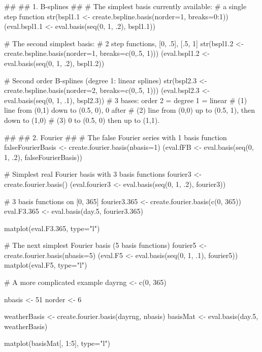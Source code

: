 \documentclass{article}
\begin{document}
\begin{Examples}
\begin{ExampleCode}
##
## 1.  B-splines
## 
# The simplest basis currently available:
# a single step function  
str(bspl1.1 <- create.bspline.basis(norder=1, breaks=0:1))
(eval.bspl1.1 <- eval.basis(seq(0, 1, .2), bspl1.1))

# The second simplest basis:
# 2 step functions, [0, .5], [.5, 1]
str(bspl1.2 <- create.bspline.basis(norder=1, breaks=c(0,.5, 1)))
(eval.bspl1.2 <- eval.basis(seq(0, 1, .2), bspl1.2))

# Second order B-splines (degree 1:  linear splines) 
str(bspl2.3 <- create.bspline.basis(norder=2, breaks=c(0,.5, 1)))
(eval.bspl2.3 <- eval.basis(seq(0, 1, .1), bspl2.3))
# 3 bases:  order 2 = degree 1 = linear 
# (1) line from (0,1) down to (0.5, 0), 0 after
# (2) line from (0,0) up to (0.5, 1), then down to (1,0)
# (3) 0 to (0.5, 0) then up to (1,1).

##
## 2.  Fourier 
## 
# The false Fourier series with 1 basis function
falseFourierBasis <- create.fourier.basis(nbasis=1)
(eval.fFB <- eval.basis(seq(0, 1, .2), falseFourierBasis))

# Simplest real Fourier basis with 3 basis functions
fourier3 <- create.fourier.basis()
(eval.fourier3 <- eval.basis(seq(0, 1, .2), fourier3))

# 3 basis functions on [0, 365]
fourier3.365 <- create.fourier.basis(c(0, 365))
eval.F3.365 <- eval.basis(day.5, fourier3.365)

matplot(eval.F3.365, type="l")

# The next simplest Fourier basis (5  basis functions)
fourier5 <- create.fourier.basis(nbasis=5)
(eval.F5 <- eval.basis(seq(0, 1, .1), fourier5))
matplot(eval.F5, type="l")

# A more complicated example
dayrng <- c(0, 365) 

nbasis <- 51
norder <- 6 

weatherBasis <- create.fourier.basis(dayrng, nbasis)
basisMat <- eval.basis(day.5, weatherBasis) 

matplot(basisMat[, 1:5], type="l")

\end{ExampleCode}
\end{Examples}
\end{document}
